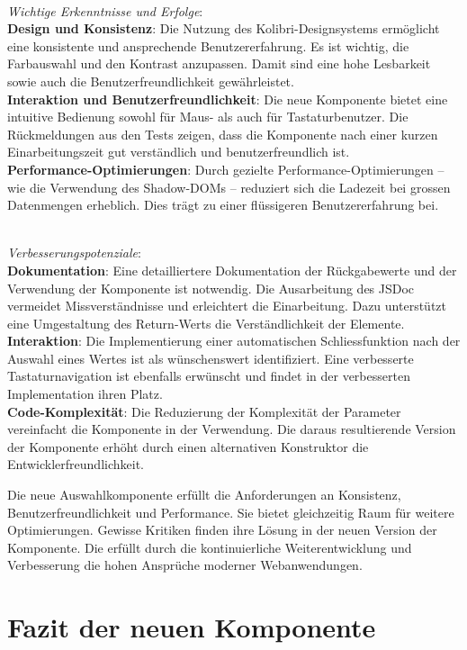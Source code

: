  \\
\noindent
\emph{Wichtige Erkenntnisse und Erfolge}: 
\\
\textbf{Design und Konsistenz}: 
Die Nutzung des Kolibri-Designsystems ermöglicht eine konsistente und ansprechende Benutzererfahrung. 
Es ist wichtig, die Farbauswahl und den Kontrast anzupassen. 
Damit sind eine hohe Lesbarkeit sowie auch die Benutzerfreundlichkeit gewährleistet.
\\
\textbf{Interaktion und Benutzerfreundlichkeit}: 
Die neue Komponente bietet eine intuitive Bedienung sowohl für Maus- als auch für Tastaturbenutzer. 
Die Rückmeldungen aus den Tests zeigen, dass die Komponente nach einer kurzen Einarbeitungszeit gut verständlich und benutzerfreundlich ist. 
\\
\textbf{Performance-Optimierungen}: 
Durch gezielte Performance-Optimierungen – wie die Verwendung des Shadow-DOMs – reduziert sich die Ladezeit bei grossen Datenmengen erheblich. 
Dies trägt zu einer flüssigeren Benutzererfahrung bei. 

 \\
\noindent
\emph{Verbesserungspotenziale}: 
\\
\textbf{Dokumentation}: 
Eine detailliertere Dokumentation der Rückgabewerte und der Verwendung der Komponente ist notwendig. 
Die Ausarbeitung des JSDoc vermeidet Missverständnisse und erleichtert die Einarbeitung. 
Dazu unterstützt eine Umgestaltung des Return-Werts die Verständlichkeit der Elemente. 
\\
\textbf{Interaktion}: 
Die Implementierung einer automatischen Schliessfunktion nach der Auswahl eines Wertes ist als wünschenswert identifiziert. 
Eine verbesserte Tastaturnavigation ist ebenfalls erwünscht und findet in der verbesserten Implementation ihren Platz. 
\\
\textbf{Code-Komplexität}: 
Die Reduzierung der Komplexität der Parameter vereinfacht die Komponente in der Verwendung. 
Die daraus resultierende Version der Komponente erhöht durch einen alternativen Konstruktor die Entwicklerfreundlichkeit. 

Die neue Auswahlkomponente erfüllt die Anforderungen an Konsistenz, Benutzerfreundlichkeit und Performance. 
Sie bietet gleichzeitig Raum für weitere Optimierungen. 
Gewisse Kritiken finden ihre Lösung in der neuen Version der Komponente. 
Die  erfüllt durch die kontinuierliche Weiterentwicklung und Verbesserung die hohen Ansprüche moderner Webanwendungen. 


\section{Fazit der neuen Komponente}
\label{sec:summeryNew}

